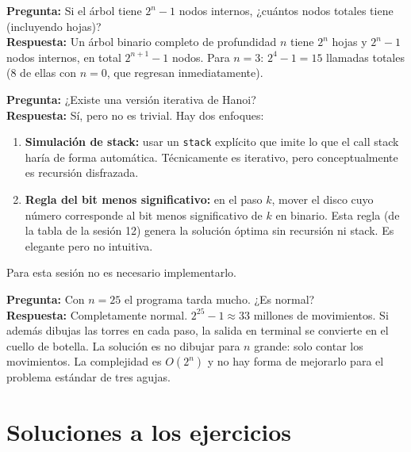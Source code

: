 \documentclass[12pt, oneside]{article}
\begin{document}
\begin{notaprofesor}
  \textbf{Pregunta:} Si el árbol tiene $2^n - 1$ nodos internos, ¿cuántos
  nodos totales tiene (incluyendo hojas)?\\
  \textbf{Respuesta:} Un árbol binario completo de profundidad $n$ tiene
  $2^n$ hojas y $2^n - 1$ nodos internos, en total $2^{n+1} - 1$ nodos.
  Para $n=3$: $2^4 - 1 = 15$ llamadas totales (8 de ellas con $n=0$,
  que regresan inmediatamente).
\end{notaprofesor}

\begin{notaprofesor}
  \textbf{Pregunta:} ¿Existe una versión iterativa de Hanoi?\\
  \textbf{Respuesta:} Sí, pero no es trivial.  Hay dos enfoques:
  \begin{enumerate}
    \item \textbf{Simulación de stack:} usar un \texttt{stack} explícito
          que imite lo que el call stack haría de forma automática.
          Técnicamente es iterativo, pero conceptualmente es recursión disfrazada.
    \item \textbf{Regla del bit menos significativo:} en el paso $k$, mover
          el disco cuyo número corresponde al bit menos significativo de $k$
          en binario.  Esta regla (de la tabla de la sesión 12) genera la
          solución óptima sin recursión ni stack.  Es elegante pero no intuitiva.
  \end{enumerate}
  Para esta sesión no es necesario implementarlo.
\end{notaprofesor}

\begin{notaprofesor}
  \textbf{Pregunta:} Con $n = 25$ el programa tarda mucho.  ¿Es normal?\\
  \textbf{Respuesta:} Completamente normal.  $2^{25} - 1 \approx 33$ millones
  de movimientos.  Si además dibujas las torres en cada paso, la salida en
  terminal se convierte en el cuello de botella.  La solución es no dibujar
  para $n$ grande: solo contar los movimientos.  La complejidad es $O(2^n)$
  y no hay forma de mejorarlo para el problema estándar de tres agujas.
\end{notaprofesor}

\section{Soluciones a los ejercicios}
\end{document}
